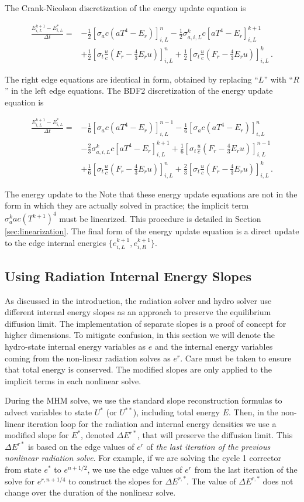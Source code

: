 \documentclass[preprint,12pt]{elsarticle}
\newcommand{\pep}{\, .}
\newcommand{\lequ}[1]{\label{eq:#1}}
\newcommand{\half}{\frac{1}{2}}
\newcommand{\sixth}{\frac{1}{6}}
\newcommand{\E}{{E_r}}
\newcommand{\F}{{F_r}}
\newcommand{\dt}{\Delta t}
\newcommand{\iL}{_{i,L}}
\newcommand{\iR}{_{i,R}}
\newcommand{\energyEmissionSource}{
   \left[\sigma_a c\left(aT^4 - \E\right)\right]
}
\newcommand{\energyEmissionSourceNew}{
   \sigma_{a,i,L}^k c\left[aT^4 - \E\right]^{k+1}
}
\newcommand{\energyDriftSource}{
   \left[\sigma_t\frac{u}{c}\left(\F-\frac{4}{3}\E u\right)\right]
}
\newcommand{\energyUpdateCN}[4]{
\begin{equation}\begin{split}
  \frac{E^{k+1}#3-E^*#3}{#2\dt} = &
  -\half\energyEmissionSource^{#1}#3
  -\half\energyEmissionSourceNew#3\\
  &+\half\energyDriftSource^{#1}#3
   +\half\energyDriftSource^k#3
  \pep
#4
\end{split}\end{equation}
}
\newcommand{\energyUpdateBDFTwo}[5]{
\begin{equation}\begin{split}
  \frac{E^{k+1}#4-E^*#4}{#3\dt} = &
  -\sixth\energyEmissionSource^{#1}#4
  -\sixth\energyEmissionSource^{#2}#4\\
  &-\frac{2}{3}\energyEmissionSourceNew#4
   +\sixth\energyDriftSource^{#1}#4\\
  &+\sixth\energyDriftSource^{#2}#4
   +\frac{2}{3}\energyDriftSource^k#4
  \pep
#5
\end{split}\end{equation}
}
\begin{document}
The Crank-Nicolson discretization of the energy update equation is
\energyUpdateCN{n}{}{\iL}{\lequ{hydroECNfull}}
The right edge equations are identical in form, obtained by replacing ``$L$'' with
``$R$'' in the left edge equations.
The BDF2 discretization of the energy update equation is
\energyUpdateBDFTwo{n-1}{n}{}{\iL}{\lequ{hydroEBDF2full}}
The energy update to the 
Note that these energy update equations are not in the form in which they
are actually solved in practice; the implicit term $\sigma_a^k a c (T^{k+1})^4$
must be linearized. This procedure is detailed in Section \ref{sec:linearization}.
The final form of the energy update equation is a direct update to the
edge internal energies $\{e\iL^{k+1},e\iR^{k+1}\}$.

\subsection{Using Radiation Internal Energy Slopes}
\label{sec:e_slopes}

As discussed in the introduction, the radiation solver and hydro solver use different
internal energy slopes as an approach to preserve the equilibrium diffusion limit.   The
implementation of separate slopes is a proof of concept for higher dimensions.
To mitigate confusion, in this section we will denote the hydro-state internal energy variables as $e$ and
the internal energy variables coming from the non-linear radiation solves as $e^r$. Care must be taken to
ensure that total energy is conserved.  The modified slopes are only applied to the implicit terms in each
nonlinear solve.

During the MHM solve, we
use the standard slope reconstruction formulas to advect variables to
state $U^*$ (or $U^{**}$), including total energy $E$.  Then, in the non-linear iteration loop for the radiation
and internal energy densities we use a modified slope for $E^*$, denoted $\Delta E^{r*}$, that will preserve the diffusion
limit.  This $\Delta E^{r*}$ is based on the edge values of $e^r$ of \emph{the last iteration of the previous
nonlinear radiation solve}.  For example, if we are solving the cycle 1 corrector from state $e^*$ to
$e^{n+1/2}$, we use the edge values of $e^r$ from the last iteration of the solve for
$e^{r,n+1/4}$ to construct the slopes for $\Delta E^{r,*}$. The value of $\Delta
E^{r,*}$ does not change over the duration of the nonlinear solve.
\end{document}

